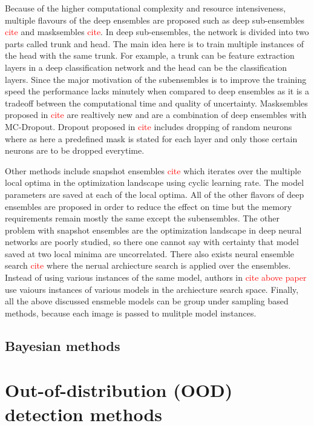     Because of the higher computational complexity and resource intensiveness, multiple flavours of the deep ensembles are proposed such as deep sub-ensembles \textcolor{red}{cite} and masksembles \textcolor{red}{cite}.
    In deep sub-ensembles, the network is divided into two parts called trunk and head.
    The main idea here is to train multiple instances of the head with the same trunk. For example, a trunk can be feature extraction layers in a deep classification network and the head can be the classification layers.
    Since the major motivation of the subensembles is to improve the training speed the performance lacks minutely when compared to deep ensembles as it is a tradeoff between the computational time and quality of uncertainty.
    Masksembles proposed in \textcolor{red}{cite} are realtively new and are a combination of deep ensembles with MC-Dropout.
    Dropout proposed in \textcolor{red}{cite} includes dropping of random neurons where as here a predefined mask is stated for each layer and only those certain neurons are to be dropped everytime.

    Other methods include snapshot ensembles \textcolor{red}{cite} which iterates over the multiple local optima in the optimization landscape using cyclic learning rate. 
    The model parameters are saved at each of the local optima. 
    All of the other flavors of deep ensembles are proposed in order to reduce the effect on time but the memory requirements remain mostly the same except the subensembles.
    The other problem with snapshot ensembles are the optimization landscape in deep neural networks are poorly studied, so there one cannot say with certainty that model saved at two local minima are uncorrelated.
    There also exists neural ensemble search \textcolor{red}{cite} where the nerual archiecture search is applied over the ensembles.
    Instead of using various instances of the same model, authors in \textcolor{red}{cite above paper} use vaiours instances of various models in the archiecture search space.
    Finally, all the above discussed ensmeble models can be group under sampling based methods, because each image is passed to mulitple model instances.    

    \subsection{Bayesian methods}
    \section{Out-of-distribution (OOD) detection methods}

